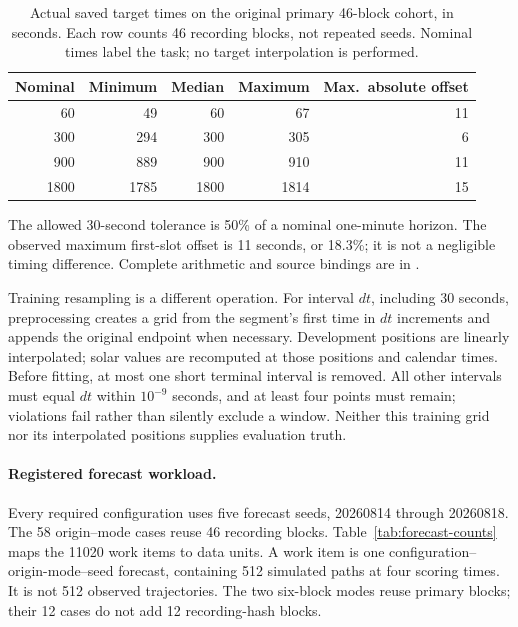 \begin{table}[htbp]
\centering\small
\caption{Actual saved target times on the original primary 46-block cohort,
in seconds. Each row counts 46 recording blocks, not repeated seeds.
Nominal times label the task; no target interpolation is performed.}
\label{tab:actual-target-times}\hypertarget{tab:actual-target-times}{}
\begin{tabular}{@{}rrrrr@{}}
\toprule
Nominal & Minimum & Median & Maximum & Max.\ absolute offset\\
\midrule
60 & 49 & 60 & 67 & 11\\
300 & 294 & 300 & 305 & 6\\
900 & 889 & 900 & 910 & 11\\
1800 & 1785 & 1800 & 1814 & 15\\
\bottomrule
\end{tabular}
\end{table}
The allowed 30-second tolerance is 50\% of a nominal one-minute horizon.
The observed maximum first-slot offset is 11 seconds, or 18.3\%;
it is not a negligible timing difference. Complete arithmetic and source
bindings are in .

Training resampling is a different operation. For interval \(dt\), including
30 seconds, preprocessing creates a grid from the segment's first time in
\(dt\) increments and appends the original endpoint when necessary.
Development positions are linearly interpolated; solar values are recomputed
at those positions and calendar times. Before fitting, at most one short
terminal interval is removed. All other intervals must equal \(dt\) within
\(10^{-9}\) seconds, and at least four points must remain; violations fail
rather than silently exclude a window. Neither this training grid nor its
interpolated positions supplies evaluation truth.

\paragraph{Registered forecast workload.}\label{sec:forecast-inventory}\hypertarget{sec:forecast-inventory}{}
Every required configuration uses five forecast seeds, 20260814 through
20260818. The 58 origin--mode cases reuse 46 recording blocks.
Table~\ref{tab:forecast-counts} maps the 11020 work items to data units.
A work item is one configuration--origin-mode--seed forecast, containing
512 simulated paths at four scoring times. It is not 512 observed
trajectories. The two six-block modes reuse primary blocks; their 12 cases
do not add 12 recording-hash blocks.

